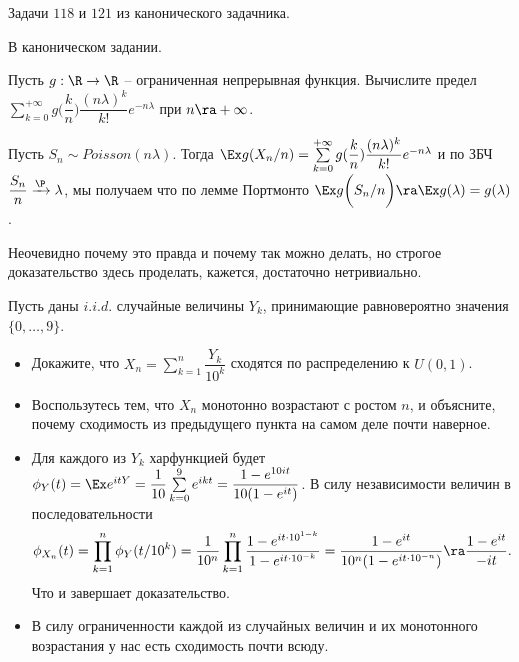 \begin{problem}
    Задачи $118$ и $121$ из канонического задачника.
\end{problem}
\begin{solution}
    В каноническом задании.
\end{solution}
\begin{problem}
    Пусть $g: \R \to \R$ -- ограниченная непрерывная функция.
    Вычислите предел $\sum\limits_{k = 0}^{+\infty} g\biggr(\dfrac{k}{n}\biggr)\dfrac{(n \lambda)^k}{k!}e^{-n\lambda}$ при $n \ra +\infty$.
\end{problem}
\begin{solution}
    Пусть $S_n \sim Poisson(n\lambda)$.
    Тогда $\Ex g(X_n/n) = \sum\limits_{k = 0}^{+\infty} g(\dfrac{k}{n})\dfrac{(n\lambda)^k}{k!}e^{-n\lambda}$ и по ЗБЧ $\dfrac{S_n}{n} \xrightarrow{\P} \lambda$, мы получаем что по лемме Портмонто $\Ex g\biggr(S_n/n\biggr) \ra \Ex g(\lambda) = g(\lambda)$.
\end{solution}
\begin{note}
    Неочевидно почему это правда и почему так можно делать, но строгое доказательство здесь проделать, кажется, достаточно нетривиально.
\end{note}
\begin{problem}
    Пусть даны $i.i.d.$ случайные величины $Y_k$, принимающие равновероятно значения $\{0, \ldots, 9\}$.
    \begin{itemize}
        \item Докажите, что $X_n = \sum\limits_{k = 1}^n \dfrac{Y_k}{10^k}$ сходятся по распределению к $U(0, 1)$.
        \item Воспользутесь тем, что $X_n$ монотонно возрастают с ростом $n$, и объясните, почему сходимость из предыдущего пункта на самом деле почти наверное.
    \end{itemize}
\end{problem}
\begin{solution} \leavevmode
    \begin{itemize}
        \item Для каждого из $Y_k$ харфункцией будет $\phi_{Y}(t) = \Ex e^{it Y} = \dfrac{1}{10}\sum\limits_{k = 0}^{9}e^{ikt} = \dfrac{1 - e^{10it}}{10(1 - e^{it})}$.
        В силу независимости величин в последовательности
        \[\phi_{X_n}(t) = \prod_{k = 1}^n \phi_Y(t/10^k) = \dfrac{1}{10^n}\prod_{k = 1}^n \dfrac{1 - e^{it \cdot 10^{1 - k}}}{1 - e^{it \cdot 10^{-k}}} = \dfrac{1 - e^{it}}{10^n(1 - e^{it \cdot 10^{-n}})} \ra \dfrac{1 - e^{it}}{-it}.\]
        Что и завершает доказательство.
        \item В силу ограниченности каждой из случайных величин и их монотонного возрастания у нас есть сходимость почти всюду.
    \end{itemize}
\end{solution}
